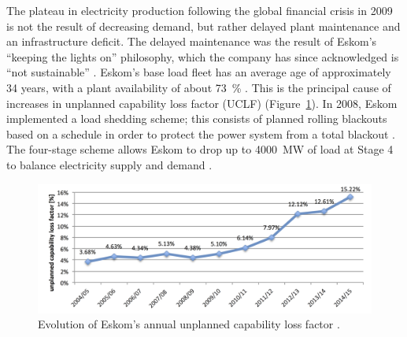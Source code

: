 The plateau in electricity production following the global financial crisis in 2009 is not the result of decreasing demand, but rather delayed plant maintenance and an infrastructure deficit. The delayed maintenance was the result of Eskom's \enquote{keeping the lights on} philosophy, which the company has since acknowledged is \enquote{not sustainable} \cite{Eskom2014}. Eskom's base load fleet has an average age of approximately 34 years, with a plant availability of about \SI{73}{\percent} \cite{Eskom2015c}. This is the principal cause of increases in unplanned capability loss factor (UCLF) (Figure~\ref{UCLF}). In 2008, Eskom implemented a load shedding scheme; this consists of planned rolling blackouts based on a schedule in order to protect the power system from a total blackout \cite{Eskom2015d}. The four-stage scheme allows Eskom to drop up to \SI{4000}{\mega\watt} of load at Stage 4 to balance electricity supply and demand \cite{Eskom2015e}.

\begin{figure}[htbp]  
\centering
\includegraphics[width=1\linewidth]{FIG/UCLF}
\caption[Evolution of Eskom's annual unplanned capability loss factor.]{Evolution of Eskom's annual unplanned capability loss factor \cite{Eskom2015b,Eskom2015d}.}\label{UCLF}
\end{figure}

